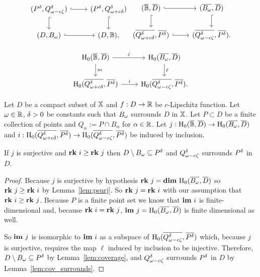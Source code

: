 \[ \begin{tikzcd}
  (P^\of, \Q^\of) \arrow[hookrightarrow]{r}\arrow[hookrightarrow]{d} &
  (P^\of, \QQ^\of) \arrow[hookrightarrow]{d} \\
  (D, \bb) \arrow[hookrightarrow]{r} &
  (D, \BB),
\end{tikzcd}\begin{tikzcd}
  (\cmp{\BB},\cmp{D})\arrow[hookrightarrow]{d}\arrow[hookrightarrow]{r} &
  (\cmp{\bb}, \cmp{D}) \arrow[hookrightarrow]{d}\\
  (\cmp{\QQ^\of}, \cmp{P^\of}) \arrow[hookrightarrow]{r} &
  (\cmp{\Q^\of}, \cmp{P^\of}).
\end{tikzcd}\]

\begin{equation}\label{dgm:1}\begin{tikzcd}
  \hom_0(\cmp{\BB},\cmp{D})\arrow{d}{m} \arrow{r}{j} &
  \hom_0(\cmp{\bb}, \cmp{D}) \arrow{d}{\ell} \\
  \hom_0(\cmp{\QQ^\of}, \cmp{P^\of}) \arrow{r}{i} &
  \hom_0(\cmp{\Q^\of}, \cmp{P^\of}).
\end{tikzcd}\end{equation}

\begin{theorem}\label{thm:geo_tcc}
  Let $D$ be a compact subset of $\mathbb{X}$ and $f : D\to\mathbb{R}$ be $c$-Lipschitz function.
  Let $\omega\in\mathbb{R}$, ${\delta} > 0$ be constants such that $B_{\omega}$ surrounds $D$ in $\mathbb{X}$.
  Let $P\subset D$ be a finite collection of points and $Q_\alpha := P\cap B_\alpha$ for $\alpha\in\mathbb{R}$.
  Let $j : \mathrm{H}_0(\overline{\mathbb{B}},\overline{D})\to \mathrm{H}_0(\overline{B_{\omega}},\overline{D})$ and $i : \mathrm{H}_0(\overline{Q_{\omega + c{\delta}}^{\delta}}, \overline{P^{\delta}})\to \mathrm{H}_0(\overline{Q_{\omega - c\zeta}^{\delta}}, \overline{P^{\delta}})$ be induced by inclusion.

  If $j$ is surjective and $\mathbf{rk}~i\geq \mathbf{rk}~j$ then $D\setminus B_{\omega}\subseteq P^{\delta}$ and $Q_{\omega - c\zeta}^{\delta}$ surrounds $P^{\delta}$ in $D$.
\end{theorem}
\begin{proof}
  Because $j$ is surjective by hypothesis $\mathbf{rk}~j = \mathbf{dim}~\mathrm{H}_0(\overline{B_{\omega}},\overline{D})$ so $\mathbf{rk}~j\geq \mathbf{rk}~i$ by Lemma~\ref{lem:psurj}.
  So $\mathbf{rk}~j = \mathbf{rk}~i$ with our assumption that $\mathbf{rk}~i\geq \mathbf{rk}~j$.
  Because $P$ is a finite point set we know that $\mathbf{im}~i$ is finite-dimensional and, because $\mathbf{rk}~i = \mathbf{rk}~j$, $\mathbf{im}~j=\mathrm{H}_0(\overline{B_{\omega}}, \overline{D})$ is finite dimensional as well.

  So $\mathbf{im}~j$ is isomorphic to $\mathbf{im}~i$ as a subspace of $\mathrm{H}_0(\overline{Q_{\omega - c\zeta}^{\delta}}, \overline{P^{\delta}})$ which, because $j$ is surjective, requires the map $\ell$ induced by inclusion to be injective.
  Therefore, $D\setminus B_\omega\subseteq P^{\delta}$ by Lemma~\ref{lem:coverage}, and $Q_{\omega - c\zeta}^{\delta}$ surrounds $P^{\delta}$ in $D$ by Lemma~\ref{lem:cov_surrounds}.
\end{proof}


